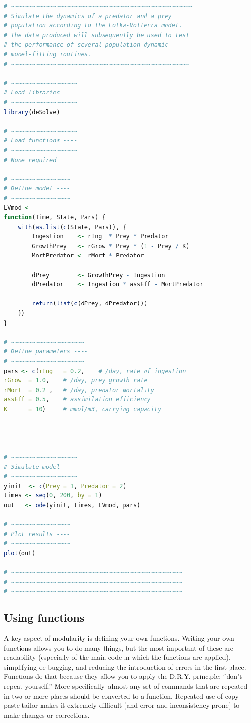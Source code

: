 \documentclass[12pt,letterpaper]{article}
\begin{document}
\begin{lstlisting}[language=R]
# ~~~~~~~~~~~~~~~~~~~~~~~~~~~~~~~~~~~~~~~~~~~~~~~~~~~~
# Simulate the dynamics of a predator and a prey 
# population according to the Lotka-Volterra model. 
# The data produced will subsequently be used to test 
# the performance of several population dynamic 
# model-fitting routines.
# ~~~~~~~~~~~~~~~~~~~~~~~~~~~~~~~~~~~~~~~~~~~~~~~~~~~

# ~~~~~~~~~~~~~~~~~~~
# Load libraries ----
# ~~~~~~~~~~~~~~~~~~~
library(deSolve)

# ~~~~~~~~~~~~~~~~~~~
# Load functions ----
# ~~~~~~~~~~~~~~~~~~~
# None required

# ~~~~~~~~~~~~~~~~~
# Define model ----
# ~~~~~~~~~~~~~~~~~
LVmod <-
function(Time, State, Pars) {
	with(as.list(c(State, Pars)), {
		Ingestion    <- rIng  * Prey * Predator
		GrowthPrey   <- rGrow * Prey * (1 - Prey / K)
		MortPredator <- rMort * Predator
		
		dPrey        <- GrowthPrey - Ingestion
		dPredator    <- Ingestion * assEff - MortPredator
		
		return(list(c(dPrey, dPredator)))
	})
}

# ~~~~~~~~~~~~~~~~~~~~~
# Define parameters ----
# ~~~~~~~~~~~~~~~~~~~~~
pars <- c(rIng   = 0.2,    # /day, rate of ingestion
rGrow  = 1.0,    # /day, prey growth rate
rMort  = 0.2 ,   # /day, predator mortality
assEff = 0.5,    # assimilation efficiency
K      = 10)     # mmol/m3, carrying capacity




# ~~~~~~~~~~~~~~~~~~~
# Simulate model ----
# ~~~~~~~~~~~~~~~~~~~
yinit  <- c(Prey = 1, Predator = 2)
times <- seq(0, 200, by = 1)
out   <- ode(yinit, times, LVmod, pars)

# ~~~~~~~~~~~~~~~~~
# Plot results ----
# ~~~~~~~~~~~~~~~~~
plot(out)

# ~~~~~~~~~~~~~~~~~~~~~~~~~~~~~~~~~~~~~~~~~~~~~~~~~
# ~~~~~~~~~~~~~~~~~~~~~~~~~~~~~~~~~~~~~~~~~~~~~~~~~
# ~~~~~~~~~~~~~~~~~~~~~~~~~~~~~~~~~~~~~~~~~~~~~~~~~
\end{lstlisting}


\subsection{Using functions}

A key aspect of modularity is defining your own functions.
Writing your own functions allows you to do many things, but the most important of these are 
readability (especially of the main code in which the functions are applied), simplifying de-bugging, 
and reducing the introduction of errors in the first place.
Functions do that because they allow you to apply the D.R.Y. principle: 
``don't repeat yourself.''
More specifically, almost any set of commands that are repeated in two or more places should be 
converted to a function.
Repeated use of copy-paste-tailor makes it extremely difficult (and error and 
inconsistency prone) to make changes or corrections.
\end{document}
